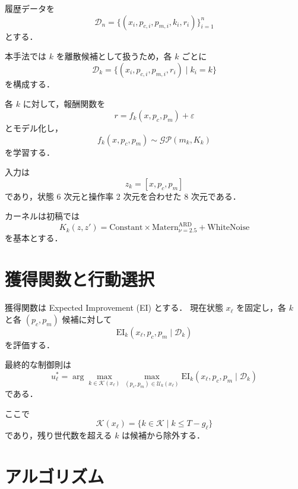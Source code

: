 \documentclass[a4paper,11pt]{ltjsarticle}
\newcommand{\EI}{\mathrm{EI}}
\begin{document}
履歴データを
\begin{equation}
\mathcal{D}_n
=
\{(x_i,p_{c,i},p_{m,i},k_i,r_i)\}_{i=1}^{n}
\end{equation}
とする．

本手法では \(k\) を離散候補として扱うため，各 \(k\) ごとに
\begin{equation}
\mathcal{D}_k
=
\{(x_i,p_{c,i},p_{m,i},r_i)\mid k_i=k\}
\end{equation}
を構成する．

各 \(k\) に対して，報酬関数を
\begin{equation}
r=f_k(x,p_c,p_m)+\varepsilon
\end{equation}
とモデル化し，
\begin{equation}
f_k(x,p_c,p_m)
\sim
\mathcal{GP}(m_k,K_k)
\end{equation}
を学習する．

入力は
\begin{equation}
z_k=[x,p_c,p_m]
\end{equation}
であり，状態 6 次元と操作率 2 次元を合わせた 8 次元である．

カーネルは初稿では
\begin{equation}
K_k(z,z')
=
\mathrm{Constant}
\times
\mathrm{Matern}_{\nu=2.5}^{\mathrm{ARD}}
+
\mathrm{WhiteNoise}
\end{equation}
を基本とする．

\section{獲得関数と行動選択}

獲得関数は Expected Improvement (EI) とする．
現在状態 \(x_\ell\) を固定し，各 \(k\) と各 \((p_c,p_m)\) 候補に対して
\begin{equation}
\EI_k(x_\ell,p_c,p_m\mid\mathcal{D}_k)
\end{equation}
を評価する．

最終的な制御則は
\begin{equation}
u_\ell^\ast
=
\arg\max_{k\in\mathcal{K}(x_\ell)}
\max_{(p_c,p_m)\in\mathcal{U}_k(x_\ell)}
\EI_k(x_\ell,p_c,p_m\mid\mathcal{D}_k)
\end{equation}
である．

ここで
\begin{equation}
\mathcal{K}(x_\ell)
=
\{k\in\mathcal{K}\mid k\le T-g_\ell\}
\end{equation}
であり，残り世代数を超える \(k\) は候補から除外する．

\section{アルゴリズム}
\end{document}
